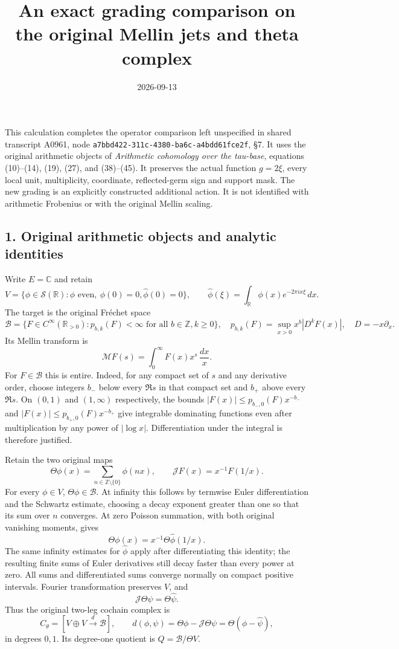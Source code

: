 \documentclass[
  11pt,
]{article}
\title{An exact grading comparison on the original Mellin jets and theta
complex}
\author{}
\date{2026-09-13}
\begin{document}
\maketitle

This calculation completes the operator comparison left unspecified in
shared transcript A0961, node
\texttt{a7bbd422-311c-4380-ba6c-a4bdd61fce2f}, §7. It uses the original
arithmetic objects of \emph{Arithmetic cohomology over the tau-base},
equations (10)--(14), (19), (27), and (38)--(45). It preserves the
actual function \(g=2\xi\), every local unit, multiplicity, coordinate,
reflected-germ sign and support mask. The new grading is an explicitly
constructed additional action. It is not identified with arithmetic
Frobenius or with the original Mellin scaling.

\subsection{1. Original arithmetic objects and analytic
identities}\label{original-arithmetic-objects-and-analytic-identities}

Write \(E=\mathbb C\) and retain \[
 V=\{\phi\in\mathcal S(\mathbb R):\phi\text{ even},\ \phi(0)=0,
              \widehat\phi(0)=0\},\qquad
 \widehat\phi(\xi)=\int_{\mathbb R}\phi(x)e^{-2\pi i x\xi}\,dx.
\] The target is the original Fréchet space \[
 \mathscr B=\{F\in C^\infty(\mathbb R_{>0}):p_{b,k}(F)<\infty
                       \text{ for all }b\in\mathbb Z,k\ge0\},
 \quad p_{b,k}(F)=\sup_{x>0}x^b|D^kF(x)|,
 \quad D=-x\partial_x.
\] Its Mellin transform is \[
 \mathcal MF(s)=\int_0^\infty F(x)x^s\,\frac{dx}{x}.
\] For \(F\in\mathscr B\) this is entire. Indeed, for any compact set of
\(s\) and any derivative order, choose integers \(b_-\) below every
\(\Re s\) in that compact set and \(b_+\) above every \(\Re s\). On
\((0,1)\) and \((1,\infty)\) respectively, the bounds
\(|F(x)|\le p_{b_-,0}(F)x^{-b_-}\) and
\(|F(x)|\le p_{b_+,0}(F)x^{-b_+}\) give integrable dominating functions
even after multiplication by any power of \(|\log x|\). Differentiation
under the integral is therefore justified.

Retain the two original maps \[
 \Theta\phi(x)=\sum_{n\in\mathbb Z\setminus\{0\}}\phi(nx),
 \qquad \mathcal JF(x)=x^{-1}F(1/x).
\] For every \(\phi\in V\), \(\Theta\phi\in\mathscr B\). At infinity
this follows by termwise Euler differentiation and the Schwartz
estimate, choosing a decay exponent greater than one so that its sum
over \(n\) converges. At zero Poisson summation, with both original
vanishing moments, gives \[
 \Theta\phi(x)=x^{-1}\Theta\widehat\phi(1/x).
\] The same infinity estimates for \(\widehat\phi\) apply after
differentiating this identity; the resulting finite sums of Euler
derivatives still decay faster than every power at zero. All sums and
differentiated sums converge normally on compact positive intervals.
Fourier transformation preserves \(V\), and \[
 \mathcal J\Theta\psi=\Theta\widehat\psi.
\] Thus the original two-leg cochain complex is \[
 C_\theta=[V\oplus V\xrightarrow{d}\mathscr B],\qquad
 d(\phi,\psi)=\Theta\phi-\mathcal J\Theta\psi
             =\Theta(\phi-\widehat\psi),
\] in degrees \(0,1\). Its degree-one quotient is
\(Q=\mathscr B/\Theta V\).
\end{document}
